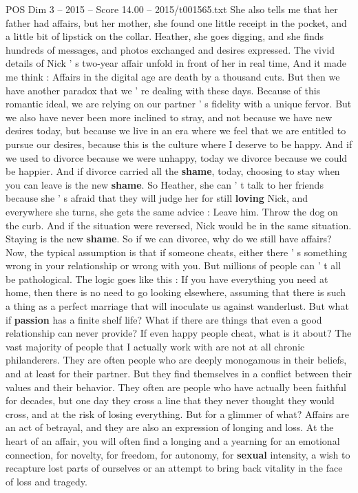 \begin{textsample}{POS Dim 3 – 2015 – Score 14.00 – 2015/t001565.txt}
She also tells me that her father had affairs, but her mother, she found one little receipt in the pocket, and a little bit of lipstick on the collar.
Heather, she goes digging, and she finds hundreds of messages, and photos exchanged and desires expressed.
The vivid details of Nick ' s two-year affair unfold in front of her in real time, And it made me think : Affairs in the digital age are death by a thousand cuts.
But then we have another paradox that we ' re dealing with these days.
Because of this romantic ideal, we are relying on our partner ' s fidelity with a unique fervor.
But we also have never been more inclined to stray, and not because we have new desires today, but because we live in an era where we feel that we are entitled to pursue our desires, because this is the culture where I deserve to be happy.
And if we used to divorce because we were unhappy, today we divorce because we could be happier.
And if divorce carried all the \textbf{shame}, today, choosing to stay when you can leave is the new \textbf{shame}.
So Heather, she can ' t talk to her friends because she ' s afraid that they will judge her for still \textbf{loving} Nick, and everywhere she turns, she gets the same advice : Leave him.
Throw the dog on the curb.
And if the situation were reversed, Nick would be in the same situation.
Staying is the new \textbf{shame}.
So if we can divorce, why do we still have affairs?
Now, the typical assumption is that if someone cheats, either there ' s something wrong in your relationship or wrong with you.
But millions of people can ' t all be pathological.
The logic goes like this : If you have everything you need at home, then there is no need to go looking elsewhere, assuming that there is such a thing as a perfect marriage that will inoculate us against wanderlust.
But what if \textbf{passion} has a finite shelf life?
What if there are things that even a good relationship can never provide?
If even happy people cheat, what is it about?
The vast majority of people that I actually work with are not at all chronic philanderers.
They are often people who are deeply monogamous in their beliefs, and at least for their partner.
But they find themselves in a conflict between their values and their behavior.
They often are people who have actually been faithful for decades, but one day they cross a line that they never thought they would cross, and at the risk of losing everything.
But for a glimmer of what?
Affairs are an act of betrayal, and they are also an expression of longing and loss.
At the heart of an affair, you will often find a longing and a yearning for an emotional connection, for novelty, for freedom, for autonomy, for \textbf{sexual} intensity, a wish to recapture lost parts of ourselves or an attempt to bring back vitality in the face of loss and tragedy.

\end{textsample}
